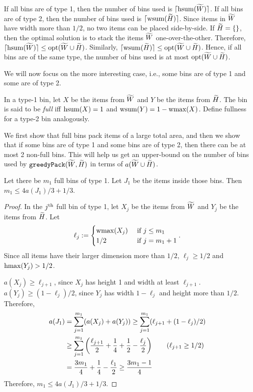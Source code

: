 If all bins are of type 1, then the number of bins used is $\lceil \operatorname{hsum}(\widetilde{W}) \rceil$.
If all bins are of type 2, then the number of bins used is $\lceil \operatorname{wsum}(\widetilde{H}) \rceil$.
Since items in $\widetilde{W}$ have width more than $1/2$, no two items can be placed side-by-side.
If $\widetilde{H} = \{\}$, then the optimal solution is to stack the items $\widetilde{W}$ one-over-the-other.
Therefore, $\lceil \operatorname{hsum}(\widetilde{W}) \rceil \le \operatorname{opt}(\widetilde{W} \cup \widetilde{H})$.
Similarly, $\lceil \operatorname{wsum}(\widetilde{H}) \rceil \le \operatorname{opt}(\widetilde{W} \cup \widetilde{H})$.
Hence, if all bins are of the same type, the number of bins used is at most $\operatorname{opt}(\widetilde{W} \cup \widetilde{H})$.

We will now focus on the more interesting case, i.e.,
some bins are of type 1 and some are of type 2.

\begin{definition}
In a type-1 bin, let $X$ be the items from $\widetilde{W}$ and $Y$ be the items from $\widetilde{H}$.
The bin is said to be \emph{full} iff $\operatorname{hsum}(X) = 1$ and $\operatorname{wsum}(Y) = 1 - \operatorname{wmax}(X)$.
Define fullness for a type-2 bin analogously.
\end{definition}

We first show that full bins pack items of a large total area,
and then we show that if some bins are of type 1 and some bins are of type 2,
then there can be at most 2 non-full bins.
This will help us get an upper-bound on the number of bins used by $\operatorname{\mathtt{greedyPack}}(\widetilde{W}, \widetilde{H})$
in terms of $a(\widetilde{W} \cup \widetilde{H})$.

\begin{lemma}
\label{thm:area-bound}
Let there be $m_1$ full bins of type 1.
Let $J_1$ be the items inside those bins.
Then $m_1 \le 4a(J_1)/3 + 1/3$.
\end{lemma}
\begin{proof}
In the $j^{\textrm{th}}$ full bin of type 1, let $X_j$ be the items from $\widetilde{W}$
and $Y_j$ be the items from $\widetilde{H}$. Let
\[ \ell_j := \begin{cases}\operatorname{wmax}(X_j) & \textrm{ if } j \le m_1
\\ 1/2 & \textrm{ if } j = m_1 + 1 \end{cases}. \]
Since all items have their larger dimension more than $1/2$,
$\ell_j \ge 1/2$ and $\operatorname{hmax}(Y_j) > 1/2$.

$a(X_j) \ge \ell_{j+1}$, since $X_j$ has height 1 and width at least $\ell_{j+1}$.
$a(Y_j) \ge (1-\ell_j)/2$, since $Y_j$ has width $1 - \ell_j$ and height more than $1/2$.
Therefore,
\begin{align*}
a(J_1) &= \sum_{j=1}^{m_1} (a(X_j) + a(Y_j))
\ge \sum_{j=1}^{m_1} (\ell_{j+1} + (1-\ell_j)/2)
\\ &\ge \sum_{j=1}^{m_1} \left(\frac{\ell_{j+1}}{2} + \frac{1}{4}
    + \frac{1}{2} - \frac{\ell_j}{2}\right)  \tag{$\ell_{j+1} \ge 1/2$}
\\ &= \frac{3m_1}{4} + \frac{1}{4} - \frac{\ell_1}{2}
\ge \frac{3m_1-1}{4}
\end{align*}
Therefore, $m_1 \le 4a(J_1)/3 + 1/3$.
\end{proof}

